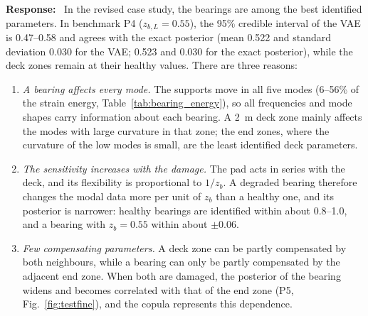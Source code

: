 \documentclass[11pt]{article}
\newenvironment{response}{\par\smallskip\noindent\color{resp}\textbf{Response:}\ }{\par}
\begin{document}
\begin{response}
In the revised case study, the bearings are among the best identified parameters. In benchmark P4 ($z_{b,L}=0.55$),
the 95\% credible interval of the VAE is 0.47--0.58 and agrees with the exact posterior (mean 0.522 and standard
deviation 0.030 for the VAE; 0.523 and 0.030 for the exact posterior), while the deck
zones remain at their healthy values. There are three reasons:
\begin{enumerate}[leftmargin=*]
\item \emph{A bearing affects every mode.} The supports move in all five modes (6--56\% of the strain energy,
Table~\ref{tab:bearing_energy}), so all frequencies and mode shapes carry information about each bearing. A 2~m deck
zone mainly affects the modes with large curvature in that zone; the end zones, where the curvature of the low modes is
small, are the least identified deck parameters.
\item \emph{The sensitivity increases with the damage.} The pad acts in series with the deck, and its flexibility is
proportional to $1/z_b$. A degraded bearing therefore changes the modal data more per unit of $z_b$ than a healthy one,
and its posterior is narrower: healthy bearings are identified within about 0.8--1.0, and a bearing with $z_b=0.55$
within about $\pm0.06$.
\item \emph{Few compensating parameters.} A deck zone can be partly compensated by both neighbours, while a bearing can
only be partly compensated by the adjacent end zone. When both are damaged, the posterior of the bearing widens and
becomes correlated with that of the end zone (P5, Fig.~\ref{fig:testfine}), and the copula represents this dependence.
\end{enumerate}


\end{response}
\end{document}
